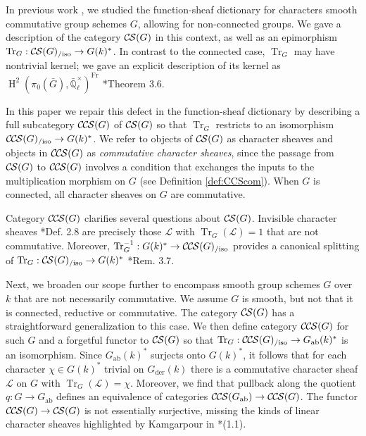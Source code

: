 \documentclass[10pt]{amsart}
\theoremstyle{plain}
\theoremstyle{definition}
\newcommand{\EE}{\mathbb{\bar Q}_\ell}
\newcommand{\Fq}{k}
\newcommand{\EEx}{\EE^\times}
\newcommand{\Frob}[1]{\operatorname{Fr}_{#1}}
\DeclareMathOperator{\Hh}{H}
\newcommand{\der}{_{\operatorname{der}}}
\newcommand{\ab}{_{\operatorname{ab}}}
\DeclareMathOperator{\Tr}{Tr}
\newcommand{\TrFrob}[1]{\Tr_{#1}}
\newcommand{\cs}[1]{{\mathcal{#1}}}
\newcommand{\CS}{{\mathcal{C\hskip-0.8pt S}}}
\newcommand{\CCS}{{\mathcal{C\hskip-.8pt C\hskip-0.8pt S}}}
\newcommand{\CSiso}[1]{\CS(#1)_{/\text{iso}}}
\newcommand{\CCSiso}[1]{\CCS(#1)_{/\text{iso}}}
\newcommand{\bG}{\bar{G}}
\begin{document}
In previous work \cite{cunningham-roe:13a}, we studied the function-sheaf dictionary for characters
smooth commutative group schemes $G$, allowing for non-connected groups.
We gave a description of the category $\CS(G)$ in this context, as well
as an epimorphism $\TrFrob{G} : \CSiso{G} \to G(k)^*$.
In contrast to the connected case, $\TrFrob{G}$ may have nontrivial kernel;
we gave an explicit description of its kernel as $\Hh^2(\pi_0(\bG), \EEx)^{\Frob{}}$ \cite{cunningham-roe:13a}*{Theorem 3.6}.  

In this paper we repair this defect in the function-sheaf dictionary
 by describing a full subcategory $\CCS(G)$ of $\CS(G)$ so that $\TrFrob{G}$ restricts to an isomorphism $\CCSiso{G} \to G(k)^*$.
We refer to objects of $\CS(G)$ as character sheaves and objects in $\CCS(G)$ as \emph{commutative character sheaves}, since the passage from $\CS(G)$ to $\CCS(G)$ involves a condition that exchanges the inputs to the multiplication morphism on $G$ (see Definition \ref{def:CCScom}).  
When $G$ is connected, all character sheaves on $G$ are commutative.

Category $\CCS(G)$ clarifies several questions about $\CS(G)$. 
Invisible character sheaves \cite{cunningham-roe:13a}*{Def. 2.8} are precisely those $\cs{L}$ with $\TrFrob{G}(\cs{L}) = 1$ that are not commutative.  Moreover, $\TrFrob{G}^{-1} : G(k)^* \to \CCSiso{G}$ provides a canonical splitting of $\TrFrob{G} : \CSiso{G} \to G(k)^*$ \cite{cunningham-roe:13a}*{Rem. 3.7}.

Next, we broaden our scope further to encompass smooth group schemes $G$ over $\Fq$ that are not necessarily commutative.
We assume $G$ is smooth, but not that it is connected, reductive or commutative. 
The category $\CS(G)$ has a straightforward generalization to this case.
We then define category $\CCS(G)$ for such $G$ and a forgetful functor to $\CS(G)$ so that $\TrFrob{G} : \CCSiso{G} \to G\ab(k)^*$
is an isomorphism.  
Since $G\ab(k)^*$ surjects onto $G(k)^*$, it follows that for each character $\chi \in G(k)^*$ trivial on $G\der(k)$ there is a commutative
character sheaf $\cs{L}$ on $G$ with $\TrFrob{G}(\cs{L}) = \chi$. Moreover, we find that pullback along the quotient $q : G \to G\ab$
defines an equivalence of categories $\CCS(G\ab) \to \CCS(G)$.  
The functor $\CCS(G) \to \CS(G)$ is not
essentially surjective, missing the kinds of linear character sheaves highlighted by Kamgarpour in \cite{kamgarpour:09a}*{(1.1)}.
\end{document}

